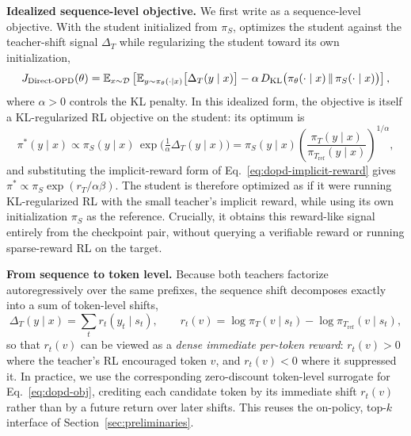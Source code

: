 \textbf{Idealized sequence-level objective.}
We first write \method{} as a sequence-level objective. With the student
initialized from $\pi_S$, \method{} optimizes the student against the
teacher-shift signal $\Delta_T$ while regularizing the student toward its own
initialization,
\begin{equation}
    J_{\text{Direct-OPD}}(\theta) = \mathbb{E}_{x\sim\mathcal{D}} \left[
    \mathbb{E}_{y\sim\pi_\theta(\cdot\mid x)} \big[ \Delta_T(y\mid x) \big]
    - \alpha\, D_{\mathrm{KL}} \big( \pi_\theta(\cdot\mid x) \,\|\, \pi_S(\cdot\mid x) \big) \right],
    \label{eq:dopd-obj}
\end{equation}
where $\alpha>0$ controls the KL penalty. In this idealized form, the objective
is itself a KL-regularized RL objective on the student: its optimum is
\begin{equation}
    \pi^*(y\mid x) \propto \pi_S(y\mid x)\, \exp\!\big(\tfrac{1}{\alpha}\Delta_T(y\mid x)\big)
    = \pi_S(y\mid x) \left( \frac{\pi_T(y\mid x)}{\pi_{T_{\mathrm{ref}}}(y\mid x)} \right)^{1/\alpha},
    \label{eq:dopd-opt}
\end{equation}
and substituting the implicit-reward form of Eq.~\ref{eq:dopd-implicit-reward}
gives $\pi^*\propto\pi_S\exp(r_T/\alpha\beta)$. The student is therefore
optimized as if it were running KL-regularized RL with the small teacher's
implicit reward, while using its own initialization $\pi_S$ as the reference.
Crucially, it obtains this reward-like signal entirely from the checkpoint pair, without querying a verifiable reward or running sparse-reward RL on the target.

\textbf{From sequence to token level.}
Because both teachers factorize autoregressively over the same prefixes, the
sequence shift decomposes exactly into a sum of token-level shifts,
\begin{equation}
    \Delta_T(y\mid x) = \sum_{t} r_t(y_t\mid s_t),
    \qquad
    r_t(v) = \log \pi_T(v\mid s_t) - \log \pi_{T_{\mathrm{ref}}}(v\mid s_t),
    \label{eq:dopd-token-reward}
\end{equation}
so that $r_t(v)$ can be viewed as a \emph{dense immediate per-token reward}:
$r_t(v)>0$ where the teacher's RL encouraged token $v$, and $r_t(v)<0$ where it
suppressed it. In practice, we use the corresponding zero-discount token-level
surrogate for Eq.~\ref{eq:dopd-obj}, crediting each candidate token by its
immediate shift $r_t(v)$ rather than by a future return over later shifts. This
reuses the on-policy, top-$k$ interface of Section~\ref{sec:preliminaries}.

